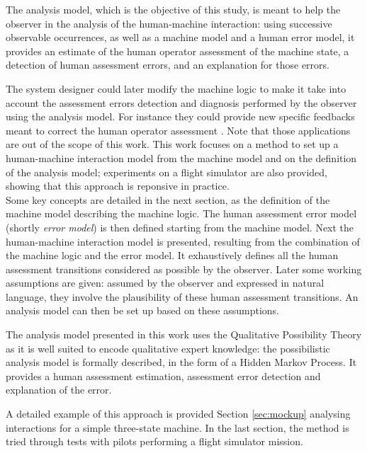The analysis model, which is the objective of this study, is meant to help 
the observer in the analysis of the human-machine interaction: 
using successive observable occurrences, as well as a machine model and a human error model, 
it provides an estimate of the human operator assessment of the machine 
state, a detection of human assessment errors, and an explanation for 
those errors.

The system designer could later modify the machine logic to make it 
take into account the assessment errors detection 
and diagnosis performed by the observer
using the analysis model. 
For instance they could provide 
new specific feedbacks meant to correct the human operator assessment \cite{dehais11ae,dehais11hf}. 
Note that those applications are out of the scope of this work. 
This work focuses on a method to set up a human-machine interaction 
model from the machine model and on the definition of the analysis model;
experiments on a flight simulator are also provided, showing that 
this approach is reponsive in practice. \\


Some key concepts are detailed in the next section, as the definition of the machine model describing the machine logic.
The human assessment error model (shortly {\em error model}) is then defined starting from the machine model.
Next the human-machine interaction model is presented, 
resulting from the combination of the machine logic and
the error model. It exhaustively defines all the human assessment transitions 
considered as possible by the observer. 
Later some working assumptions are given:
assumed by the observer
and expressed in natural language, they involve
the plausibility of these human assessment transitions. 
An analysis model can then be set up based on these assumptions.

The analysis model presented in this work uses the Qualitative Possibility Theory
as it is well suited to encode qualitative expert knowledge:
the possibilistic analysis model is formally described, 
in the form of a Hidden Markov Process. 
It provides a human assessment estimation, 
assessment error detection and explanation of the error.

A detailed example of this approach is provided 
Section \ref{sec:mockup} analysing interactions 
for a simple three-state machine.
In the last section, the method is tried 
through tests with pilots performing a flight 
simulator mission.

